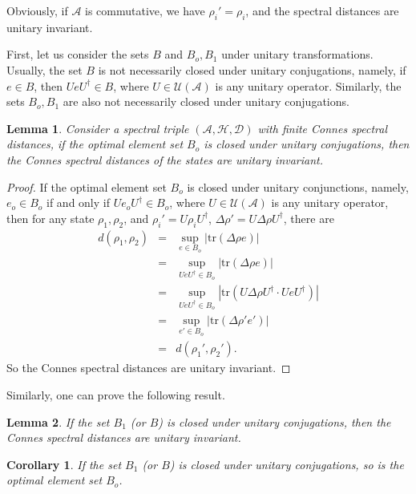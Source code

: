 \documentclass[a4paper,12pt]{article}
\newtheorem{corollary}{Corollary}
\newtheorem{lemma}{Lemma}
\begin{document}
Obviously, if $\mathcal{A}$ is commutative, we have $\rho_i' = \rho_i$, and
the spectral distances are unitary invariant.

First, let us consider the sets $B$ and $B_o, B_1$ under unitary
transformations. Usually, the set $B$ is not necessarily closed under unitary
conjugations, namely, if $e \in B$, then $UeU^{\dag} \in B$, where $U \in
\mathcal{U} (\mathcal{A})$ is any unitary operator. Similarly, the sets $B_o,
B_1$ are also not necessarily closed under unitary conjugations.

\begin{lemma}
  Consider a spectral triple $(\mathcal{A}, \mathcal{H}, \mathcal{D})$ with
  finite Connes spectral distances, if the optimal element set $B_o$ is closed
  under unitary conjugations, then the Connes spectral distances of the states
  are unitary invariant.
\end{lemma}

\begin{proof}
If the optimal element set $B_o$ is closed under
unitary conjunctions, namely, $e_o \in B_o$ if and only if $Ue_o U^{\dag} \in
B_o$, where $U \in \mathcal{U} (\mathcal{A})$ is any unitary operator, then
for any state $\rho_1, \rho_2$, and $\rho_i' = U \rho_i U^{\dag}$, $\Delta
\rho' = U \Delta \rho U^{\dag}$, there are
\begin{eqnarray}
  d (\rho_1, \rho_2) & = & \sup_{e \in B_o} | \mathrm{tr} (\Delta \rho e) |
  \nonumber\\
  & = & \sup_{UeU^{\dag} \in B_o} | \mathrm{tr} (\Delta \rho e) | \nonumber\\
  & = & \sup_{UeU^{\dag} \in B_o} | \mathrm{tr} (U \Delta \rho U^{\dag} \cdot
  UeU^{\dag}) | \nonumber\\
  & = & \sup_{e' \in B_o} | \mathrm{tr} (\Delta \rho' e') | \nonumber\\
  & = & d (\rho_1', \rho_2') . 
\end{eqnarray}
So the Connes spectral distances are unitary
invariant.
\end{proof}

Similarly, one can prove the following result.

\begin{lemma}
  If the set $B_1$ (or $B$) is closed under unitary conjugations, then the
  Connes spectral distances are unitary invariant.
\end{lemma}

\begin{corollary}
  If the set $B_1$ (or $B$) is closed under unitary conjugations, so is the
  optimal element set $B_o$.
\end{corollary}
\end{document}
